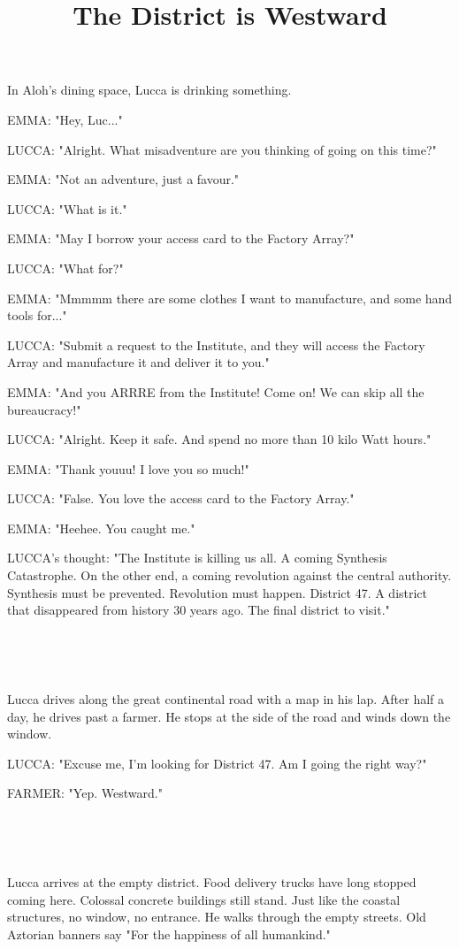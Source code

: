 \documentclass[11pt]{article}
\begin{document}
\ttfamily
\title{The District is Westward}
\maketitle

In Aloh's dining space, Lucca is drinking something.

EMMA: "Hey, Luc..."

LUCCA: "Alright. 
What misadventure are you thinking of going on this time?"

EMMA: "Not an adventure, just a favour."

LUCCA: "What is it."

EMMA: "May I borrow your access card to the Factory Array?"

LUCCA: "What for?"

EMMA: "Mmmmm there are some clothes I want to manufacture, and some hand tools for..."

LUCCA: "Submit a request to the Institute, and they will access the Factory Array and manufacture it and deliver it to you."

EMMA: "And you ARRRE from the Institute!
Come on!
We can skip all the bureaucracy!"

LUCCA: "Alright. 
Keep it safe. 
And spend no more than 10 kilo Watt hours."

EMMA: "Thank youuu! I love you so much!"

LUCCA: "False. You love the access card to the Factory Array."

EMMA: "Heehee. You caught me."

LUCCA's thought: "The Institute is killing us all.
A coming Synthesis Catastrophe.
On the other end, a coming revolution against the central authority.
Synthesis must be prevented.
Revolution must happen.
District 47. 
A district that disappeared from history 30 years ago.
The final district to visit."

\ 

\ 

Lucca drives along the great continental road with a map in his lap.
After half a day, he drives past a farmer.
He stops at the side of the road and winds down the window.

LUCCA: "Excuse me, I'm looking for District 47. 
Am I going the right way?"

FARMER: "Yep. Westward."

\ 

\ 

Lucca arrives at the empty district.
Food delivery trucks have long stopped coming here.
Colossal concrete buildings still stand.
Just like the coastal structures, no window, no entrance.
He walks through the empty streets. 
Old Aztorian banners say "For the happiness of all humankind."
\end{document}
